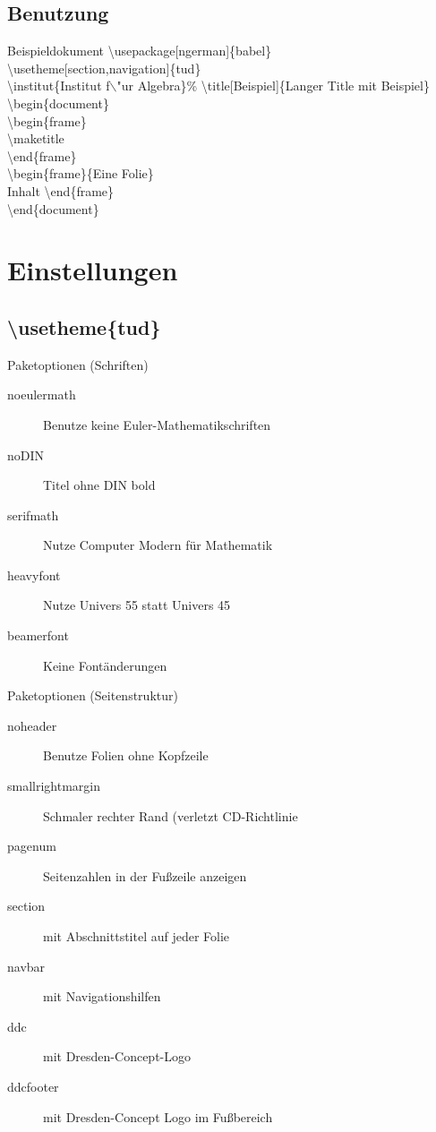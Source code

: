 \documentclass[presentation,t]{beamer}
\begin{document}
\subsection{Benutzung}
\label{sec-1-2}
\begin{frame}[label=sec-1-2-1]{Beispieldokument}
\textbackslash usepackage[ngerman]\{babel\}\\
\textbackslash usetheme[section,navigation]\{tud\}\\
\textbackslash institut\{Institut f$\backslash$"ur Algebra\}\%
\textbackslash title[Beispiel]\{Langer Title mit Beispiel\}
\textbackslash begin\{document\}\\
\textbackslash begin\{frame\}\\
\textbackslash maketitle\\
\textbackslash end\{frame\}\\
\textbackslash begin\{frame\}\{Eine Folie\}\\
Inhalt
\textbackslash end\{frame\}\\
\textbackslash end\{document\}\\
\end{frame}

\section{Einstellungen}
\label{sec-2}
\subsection{\textbackslash usetheme\{tud\}}
\label{sec-2-1}
\begin{frame}[label=sec-2-1-1]{Paketoptionen (Schriften)}
\begin{description}
\item[{noeulermath}] Benutze keine Euler-Mathematikschriften
\item[{noDIN}] Titel ohne DIN bold
\item[{serifmath}] Nutze Computer Modern für Mathematik
\item[{heavyfont}] Nutze Univers 55 statt Univers 45
\item[{beamerfont}] Keine Fontänderungen
\end{description}
\end{frame}
\begin{frame}[label=sec-2-1-2]{Paketoptionen (Seitenstruktur)}
\begin{description}
\item[{noheader}] Benutze Folien ohne Kopfzeile
\item[{smallrightmargin}] Schmaler rechter Rand (verletzt CD-Richtlinie
\item[{pagenum}] Seitenzahlen in der Fußzeile anzeigen
\item[{section}] mit Abschnittstitel auf jeder Folie
\item[{navbar}] mit Navigationshilfen
\item[{ddc}] mit Dresden-Concept-Logo
\item[{ddcfooter}] mit Dresden-Concept Logo im Fußbereich
\end{description}
\end{frame}
\end{document}
